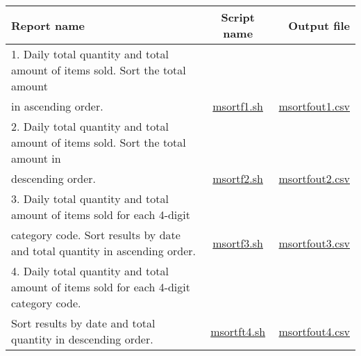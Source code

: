 \begin{table}[htbp]
{\small
\begin{tabular}{ l | c || r }
\hline
\textbf{Report name}   & \textbf{Script name} & \textbf{Output file}  \\
\hline
1. Daily total quantity and total amount of items sold. Sort the total amount \\in ascending order.  & \href{exercise/msortf1.sh}{msortf1.sh} & \href{exercise/outdat/msortfout1.csv}{msortfout1.csv} \\
2. Daily total quantity and total amount of items sold. Sort the total amount in \\descending order.  & \href{exercise/msortf2.sh}{msortf2.sh} & \href{exercise/outdat/msortfout2.csv}{msortfout2.csv} \\
3. Daily total quantity and total amount of items sold for each 4-digit \\category code. Sort results by date and total quantity in ascending order. & \href{exercise/msortf3.sh}{msortf3.sh} & \href{exercise/outdat/msortfout3.csv}{msortfout3.csv} \\
4. Daily total quantity and total amount of items sold for each 4-digit category code. \\Sort results by date and  total quantity in descending order. & \href{exercise/msortf4.sh}{msortft4.sh} & \href{exercise/outdat/msortfout4.csv}{msortfout4.csv} \\

\hline
\end{tabular} 
}
\end{table} 


%

